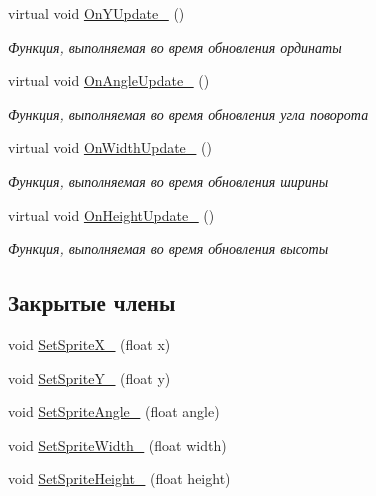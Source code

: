 \begin{DoxyCompactItemize}
\mbox{\label{classrtm_1_1_world_object_ad6e57a1a4696307449bdd9376bfcdd75}} 
virtual void \hyperlink{classrtm_1_1_world_object_ad6e57a1a4696307449bdd9376bfcdd75}{On\+Y\+Update\+\_\+} ()
\begin{DoxyCompactList}\small\item\em Функция, выполняемая во время обновления ординаты \end{DoxyCompactList}\item 
\mbox{\label{classrtm_1_1_world_object_aeaf9640864189b88f41a4ea24ef8b5f9}} 
virtual void \hyperlink{classrtm_1_1_world_object_aeaf9640864189b88f41a4ea24ef8b5f9}{On\+Angle\+Update\+\_\+} ()
\begin{DoxyCompactList}\small\item\em Функция, выполняемая во время обновления угла поворота \end{DoxyCompactList}\item 
\mbox{\label{classrtm_1_1_world_object_acb07848ff4e36ac3b77a6c2aea2f6547}} 
virtual void \hyperlink{classrtm_1_1_world_object_acb07848ff4e36ac3b77a6c2aea2f6547}{On\+Width\+Update\+\_\+} ()
\begin{DoxyCompactList}\small\item\em Функция, выполняемая во время обновления ширины \end{DoxyCompactList}\item 
\mbox{\label{classrtm_1_1_world_object_a3261c4ad76d199370db74a4fd09ddf29}} 
virtual void \hyperlink{classrtm_1_1_world_object_a3261c4ad76d199370db74a4fd09ddf29}{On\+Height\+Update\+\_\+} ()
\begin{DoxyCompactList}\small\item\em Функция, выполняемая во время обновления высоты \end{DoxyCompactList}\end{DoxyCompactItemize}
\subsection*{Закрытые члены}
\begin{DoxyCompactItemize}
\item 
void \hyperlink{classrtm_1_1_world_object_a57de67f0e2788f0b3226beb2b84a5551}{Set\+Sprite\+X\+\_\+} (float x)
\item 
void \hyperlink{classrtm_1_1_world_object_a885eff01e5b07ef96194a868ff1fe338}{Set\+Sprite\+Y\+\_\+} (float y)
\item 
void \hyperlink{classrtm_1_1_world_object_a5daee1cc41f0657f33d6790c22614f5e}{Set\+Sprite\+Angle\+\_\+} (float angle)
\item 
void \hyperlink{classrtm_1_1_world_object_a2a88c51a636b8b8c94320c0f6d66feb7}{Set\+Sprite\+Width\+\_\+} (float width)
\item 
void \hyperlink{classrtm_1_1_world_object_a553abd97f4f63659282f1e903dfc074b}{Set\+Sprite\+Height\+\_\+} (float height)
\end{DoxyCompactItemize}
